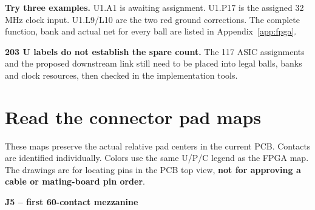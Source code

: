 \documentclass[11pt,a4paper]{article}
\begin{document}
\textbf{Try three examples.} U1.A1 is awaiting assignment. U1.P17 is the assigned 32 MHz clock input. U1.L9/L10 are the two red ground corrections. The complete function, bank and actual net for every ball are listed in Appendix~\ref{app:fpga}.

\textbf{203 U labels do not establish the spare count.} The 117 ASIC assignments and the proposed downstream link still need to be placed into legal balls, banks and clock resources, then checked in the implementation tools.


\clearpage\section{Read the connector pad maps}\label{sec:maps}

These maps preserve the actual relative pad centers in the current PCB. Contacts are identified individually. Colors use the same U/P/C legend as the FPGA map. The drawings are for locating pins in the PCB top view, \textbf{not for approving a cable or mating-board pin order}.

\textbf{J5 -- first 60-contact mezzanine}
\end{document}

